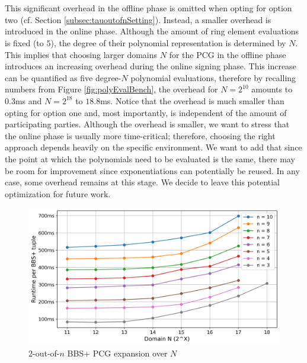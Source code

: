 \\\\
This significant overhead in the offline phase is omitted when opting for option two (cf. Section \ref{subsec:tauoutofnSetting}). Instead, a smaller overhead is introduced in the online phase. Although the amount of ring element evaluations is fixed (to $5$), the degree of their polynomial representation is determined by $N$. This implies that choosing larger domains $N$ for the PCG in the offline phase introduces an increasing overhead during the online signing phase. This increase can be quantified as five degree-$N$ polynomial evaluations, therefore by recalling numbers from Figure \ref{fig:polyEvalBench}, the overhead for $N=2^{10}$ amounts to $0.3$ms and $N=2^{18}$ to $18.8$ms. Notice that the overhead is much smaller than opting for option one and, most importantly, is independent of the amount of participating parties. Although the overhead is smaller, we want to stress that the online phase is usually more time-critical; therefore, choosing the right approach depends heavily on the specific environment. We want to add that since the point at which the polynomials need to be evaluated is the same, there may be room for improvement since exponentiations can potentially be reused. In any case, some overhead remains at this stage. We decide to leave this potential optimization for future work. 

\begin{figure}[t]
    \centering
    \includegraphics[scale=0.49]{images/plots/bbs_pcg_TAUoutofN.png}
    \caption{$2$-out-of-$n$ BBS+ PCG expansion over $N$}
    \label{fig:BBStauoutofn}
\end{figure}

